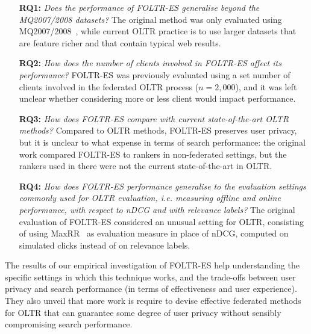 \begin{itemize}
	\item[\bf RQ1:] \textit{Does the performance of FOLTR-ES generalise beyond the MQ2007/2008 datasets?} The original method was only evaluated using MQ2007/2008~\cite{DBLP:journals/corr/QinL13}, while current OLTR practice is to use larger datasets that are feature richer and that contain typical web results.
	\item[\bf RQ2:] \textit{How does the number of clients involved in FOLTR-ES affect its performance?} FOLTR-ES was previously evaluated using a set number of clients involved in the federated OLTR process ($n=2,000$), and it was left unclear whether considering more or less client would impact performance.
	\item[\bf RQ3:] \textit{How does FOLTR-ES compare with current state-of-the-art OLTR methods?} Compared to OLTR methods, FOLTR-ES preserves user privacy, but it is unclear to what expense in terms of search performance: the original work compared FOLTR-ES to rankers in non-federated settings, but the rankers used in there were not the current state-of-the-art in OLTR.
	\item[\bf RQ4:] \textit{How does FOLTR-ES performance generalise to the evaluation settings commonly used for OLTR evaluation, i.e. measuring offline and online performance, with respect to nDCG and with relevance labels?} The original evaluation of FOLTR-ES considered an unusual setting for OLTR, consisting of using MaxRR~\cite{radlinski2008learning} as evaluation measure in place of nDCG, computed on simulated clicks instead of on relevance labels.
\end{itemize}

The results of our empirical investigation of FOLTR-ES help understanding the specific settings in which this technique works, and the trade-offs between user privacy and search performance (in terms of effectiveness and user experience). They also unveil that more work is require to devise effective federated methods for OLTR that can guarantee some degree of user privacy without sensibly compromising search performance.